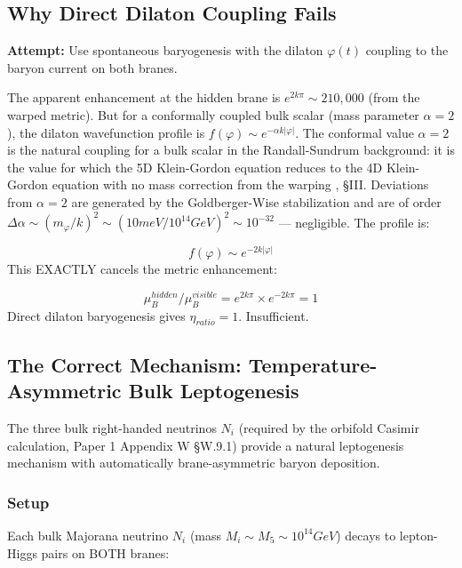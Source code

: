 \documentclass[aps,prd,preprint,superscriptaddress,longbibliography]{revtex4-2}
\begin{document}
\subsection{Why Direct Dilaton Coupling Fails}

\textbf{Attempt:} Use spontaneous baryogenesis \cite{CohenKaplan1987} with the dilaton $\varphi(t)$ coupling to the baryon current on both branes.

The apparent enhancement at the hidden brane is $e^{2k\pi} \sim  210,000$ (from the warped metric). But for a conformally coupled bulk scalar (mass parameter $\alpha = 2$), the dilaton wavefunction profile is $f(\varphi) \sim  e^{-\alpha k|\varphi|}$. The conformal value $\alpha = 2$ is the natural coupling for a bulk scalar in the Randall-Sundrum background: it is the value for which the 5D Klein-Gordon equation reduces to the 4D Klein-Gordon equation with no mass correction from the warping \cite{GoldbergerWise1999}, \S{}III. Deviations from $\alpha = 2$ are generated by the Goldberger-Wise stabilization and are of order $\Delta\alpha \sim  (m_\varphi/k)^{2} \sim  (10 meV / 10^{14} GeV)^{2} \sim  10^{-32}$ --- negligible. The profile is:


\begin{equation}
    f(\varphi) \sim  e^{-2k|\varphi|}
\end{equation}
This EXACTLY cancels the metric enhancement:


\begin{equation}
    \mu_B^{hidden} / \mu_B^{visible} = e^{2k\pi} \times e^{-2k\pi} = 1
\end{equation}
Direct dilaton baryogenesis gives $\eta_{ratio} = 1$. Insufficient.



\subsection{The Correct Mechanism: Temperature-Asymmetric Bulk Leptogenesis}

The three bulk right-handed neutrinos $N_i$ (required by the orbifold Casimir calculation, Paper 1 Appendix W \S{}W.9.1) provide a natural leptogenesis mechanism with automatically brane-asymmetric baryon deposition.


\subsubsection{Setup}

Each bulk Majorana neutrino $N_i$ (mass $M_i \sim  M_{5} \sim  10^{14} GeV$) decays to lepton-Higgs pairs on BOTH branes:
\end{document}
